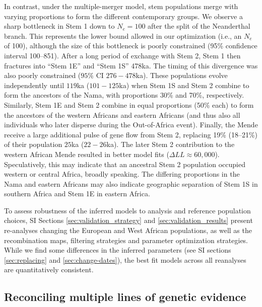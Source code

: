 \documentclass[]{article}
\begin{document}
In contrast, under the multiple-merger model, stem populations merge with
varying proportions to form the different contemporary groups.  We observe a
sharp bottleneck in Stem 1 down to $N_e=100$ after the split of the Neanderthal
branch. This represents the lower bound allowed in our optimization (i.e., an
$N_e$ of 100), although the size of this bottleneck is poorly constrained (95\%
confidence interval 100--851). After a long period of exchange with Stem 2,
Stem 1 then fractures into ``Stem 1E'' and ``Stem 1S'' 478ka. The timing of
this divergence was also poorly constrained ($95\%$ CI $276-478$ka).  These
populations evolve independently until $119$ka ($101-125$ka) when Stem 1S and Stem
2 combine to form the ancestors of the Nama, with proportions 30\% and 70\%,
respectively. Similarly, Stem 1E and Stem 2 combine in equal proportions (50\%
each) to form the ancestors of the western Africans and eastern Africans (and
thus also all individuals who later disperse during the Out-of-Africa event).
Finally, the Mende receive a large additional pulse of gene flow from Stem 2,
replacing 19\% (18--21\%) of their population $25$ka ($22-26$ka). The later Stem 2
contribution to the western African Mende resulted in better model fits
($\Delta LL \approx 60,000$). Speculatively, this may indicate that an
ancestral Stem 2 population occupied western or central Africa, broadly
speaking. The differing proportions in the Nama and eastern Africans may also
indicate geographic separation of Stem 1S in southern Africa and Stem 1E in
eastern Africa. 

To assess robustness of the inferred models to analysis and reference
population choices, SI Sections \ref{sec:validation_strategy}
and \ref{sec:validation_results} present re-analyses changing the European and
West African populations, as well as the recombination maps, filtering
strategies and parameter optimization strategies. While we find some
differences in the inferred parameters (see SI sections
\ref{sec:replacing} and \ref{sec:change-dates}), the best fit models across all
reanalyses are quantitatively consistent. 

\subsection*{Reconciling multiple lines of genetic evidence}
\end{document}

